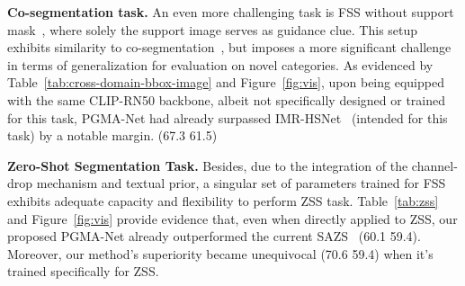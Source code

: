 \documentclass[lettersize,journal]{IEEEtran}
\begin{document}
\begin{table*}[h]
  \centering
  \caption{Comparison of zero-shot segmentation task on ~\cite{shaban2017one}.}
  \label{tab:zss}
\end{table*}






\textbf{Co-segmentation task.}
An even more challenging task is FSS without support mask~\cite{wang2023iterative, siam2020weakly}, where solely the support image serves as guidance clue. This setup exhibits similarity to co-segmentation~\cite{zhu2020adacoseg,li2019group}, but imposes a more significant challenge in terms of generalization for evaluation on novel categories. As evidenced by Table~\ref{tab:cross-domain-bbox-image} and Figure~\ref{fig:vis}, upon being equipped with the same CLIP-RN50 backbone, albeit not specifically designed or trained for this task, PGMA-Net had already surpassed IMR-HSNet~\cite{wang2023iterative} (intended for this task) by a notable margin. (67.3  61.5)

\textbf{Zero-Shot Segmentation Task.}
Besides, due to the integration of the channel-drop mechanism and textual prior, a singular set of parameters trained for FSS exhibits adequate capacity and flexibility to perform ZSS task. Table~\ref{tab:zss} and Figure~\ref{fig:vis} provide evidence that, even when directly applied to ZSS, our proposed PGMA-Net already outperformed the current SAZS~\cite{liu2023delving} (60.1  59.4). Moreover, our method's superiority became unequivocal (70.6  59.4) when it's trained specifically for ZSS.
\end{document}
